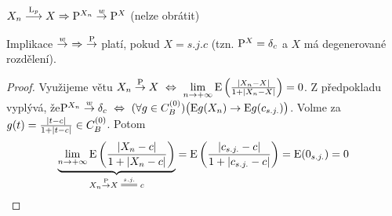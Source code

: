 \begin{dusl}
	$ X_n\stackrel{\mathrm{L}_p}{\longrightarrow}X\Rightarrow \mathrm{P}^{X_n}\stackrel{w}{\to} \mathrm{P}^X $ (nelze obrátit)
\end{dusl}
\begin{theorem}\label{ptocdtoc}
	Implikace $\stackrel{w}{\to}~\Rightarrow~\stackrel{\mathrm{P}}{\to}$ platí, pokud $X\equal{s.j.}c$ (tzn. $\mathrm{P}^X=\delta_c$ a $X$ má degenerované rozdělení).
	\begin{proof}
		Využijeme větu $X_n\stackrel{\mathrm{P}}{\to} X~\Leftrightarrow~\lim\limits_{ n\to +\infty} \mathrm{E} \left( \frac{|X_n-X|}{1+|X_n-X|} \right)=0$. Z předpokladu vyplývá, že\newline $\mathrm{P}^{X_n}\stackrel{w}{\to} \delta_c~\Leftrightarrow~(\forall g\in C_B^{(0)})\bigl(\mathrm{E} g(X_n)\to \mathrm{E} g(c_{s.j.})\bigr)$. Volme za $g(t)=\frac{|t-c|}{1+|t-c|}\in C_B^{(0)}$. Potom
		$$ \underbrace{\lim\limits_{ n\to +\infty}\E \left( \frac{|X_n-c|}{1+|X_n-c|} \right)}_{X_n\Pto X\equal{s.j.}c}=\E \left( \frac{|c_{s.j.}-c|}{1+|c_{s.j.}-c|} \right)=\E (0_{s.j.})=0 $$
	\end{proof}
\end{theorem}
